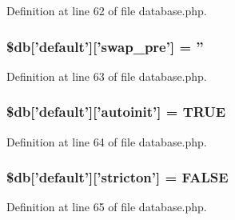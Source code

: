 Definition at line 62 of file database.\-php.

\subsubsection[{\$db}]{\setlength{\rightskip}{0pt plus 5cm}\$db['default']['swap\-\_\-pre'] = ''}\label{production_2database_8php_af35b6847ece1c0a956c97ebb90186e45}


Definition at line 63 of file database.\-php.

\subsubsection[{\$db}]{\setlength{\rightskip}{0pt plus 5cm}\$db['default']['autoinit'] = T\-R\-U\-E}\label{production_2database_8php_a217a1c42eadc83da9cdd9e3d694e53fa}


Definition at line 64 of file database.\-php.

\subsubsection[{\$db}]{\setlength{\rightskip}{0pt plus 5cm}\$db['default']['stricton'] = F\-A\-L\-S\-E}\label{production_2database_8php_a5722ababeee63dd26d82734e3fa83b7c}


Definition at line 65 of file database.\-php.

